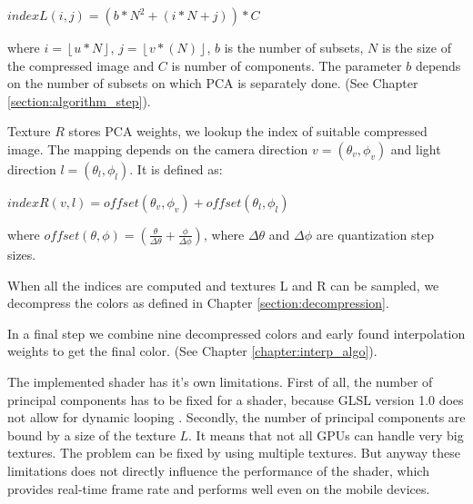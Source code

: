{\centering$indexL(i,j)= (b*N^2+ (i*N+j))*C$ \\}

where $i=\left \lfloor u*N\right \rfloor$, $j=\left \lfloor v*(N) \right \rfloor$, $b$ is the number of subsets, $N$ is the size of the compressed image and $C$ is number of components.
The parameter $b$ depends on the number of subsets on which PCA is separately done. (See Chapter \ref{section:algorithm_step}).

Texture $R$ stores PCA weights, we lookup the index of suitable compressed image.
The mapping depends on the camera direction $v=(\theta_v,\phi_v)$ and light direction $l=(\theta_l,\phi_l)$.
 It is defined as:

{\centering$ indexR(v,l)=offset(\theta_v,\phi_v)+offset(\theta_l,\phi_l)$\\}

where  $offset(\theta,\phi)=(\tfrac{\theta}{\Delta\theta}+\tfrac{\phi}{\Delta\phi})$, where $\Delta\theta$ and $\Delta\phi$ are quantization step sizes.

When all the indices are computed and textures L and R can be sampled, we decompress the colors as defined in Chapter \ref{section:decompression}.


In a final step we combine nine decompressed colors and early found interpolation weights to get the final color. (See Chapter \ref{chapter:interp_algo}).

The implemented shader has it's own limitations. First of all, the number of principal components has to be fixed for a shader, because GLSL version 1.0 does not allow for dynamic looping \cite{glsl}.
Secondly, the number of principal components are bound by a size of the texture $L$. It means that not all GPUs can handle very big textures. The problem can be fixed by using multiple textures.
But anyway these limitations does not directly influence the performance of the shader, which provides real-time frame rate and performs well even on the mobile devices. 






 



